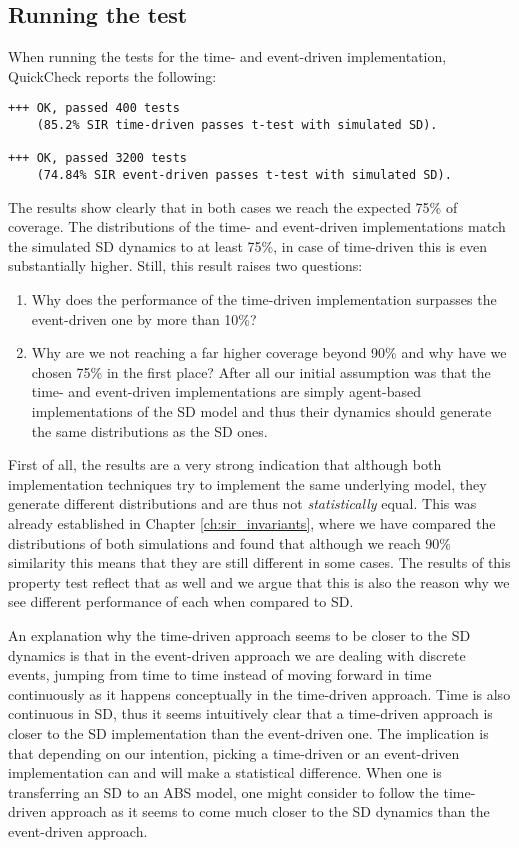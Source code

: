 \subsection{Running the test}
When running the tests for the time- and event-driven implementation, \\ QuickCheck reports the following:

\begin{verbatim}
+++ OK, passed 400 tests 
    (85.2% SIR time-driven passes t-test with simulated SD).

+++ OK, passed 3200 tests 
    (74.84% SIR event-driven passes t-test with simulated SD).
\end{verbatim}

The results show clearly that in both cases we reach the expected 75\% of coverage. The distributions of the time- and event-driven implementations match the simulated SD dynamics to at least 75\%, in case of time-driven this is even substantially higher. Still, this result raises two questions:

\begin{enumerate}
	\item Why does the performance of the time-driven implementation surpasses the event-driven one by more than 10\%?
	
	\item Why are we not reaching a far higher coverage beyond 90\% and why have we chosen 75\% in the first place? After all our initial assumption was that the time- and event-driven implementations are simply agent-based implementations of the SD model and thus their dynamics should generate the same distributions as the SD ones.	
\end{enumerate}

First of all, the results are a very strong indication that although both implementation techniques try to implement the same underlying model, they generate different distributions and are thus not \textit{statistically} equal. This was already established in Chapter \ref{ch:sir_invariants}, where we have compared the distributions of both simulations and found that although we reach 90\% similarity this means that they are still different in some cases. The results of this property test reflect that as well and we argue that this is also the reason why we see different performance of each when compared to SD. 

An explanation why the time-driven approach seems to be closer to the SD dynamics is that in the event-driven approach we are dealing with discrete events, jumping from time to time instead of moving forward in time continuously as it happens conceptually in the time-driven approach. Time is also continuous in SD, thus it seems intuitively clear that a time-driven approach is closer to the SD implementation than the event-driven one. The implication is that depending on our intention, picking a time-driven or an event-driven implementation can and will make a statistical difference. When one is transferring an SD to an ABS model, one might consider to follow the time-driven approach as it seems to come much closer to the SD dynamics than the event-driven approach.

